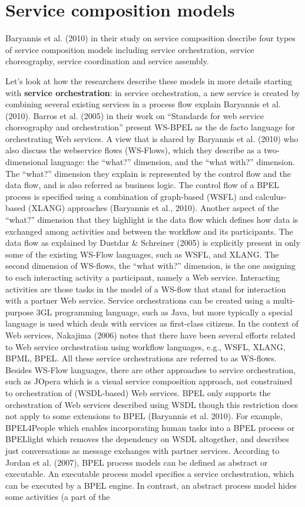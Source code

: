 \documentclass{article}
\begin{document}
\section{Service composition models}

Baryannis et al. (2010) in their study on service composition describe four types of service composition models including service orchestration, service choreography, service coordination and service assembly. 

Let’s look at how the researchers describe these models in more details starting with \textbf{service orchestration}: in service orchestration, a new service is created by combining several existing services in a process flow explain Baryannis et al. (2010). Barros et al. (2005) in their work on “Standards for web service choreography and orchestration” present WS-BPEL as the de facto language for orchestrating Web services. A view that is shared by Baryannis et al. (2010) who also discuss the webservice flows (WS-Flows), which they describe as a two-dimensional language: the “what?” dimension, and the “what with?” dimension. The “what?” dimension they explain is represented by the control flow and the data flow, and is also referred as business logic. The control flow of a BPEL process is specified using a combination of graph-based (WSFL) and calculus-based (XLANG) approaches (Baryannis et al., 2010). Another aspect of the “what?” dimension that they highlight is the data flow which defines how data is exchanged among activities and between the workflow and its participants. The data flow as explained by Dustdar \& Schreiner (2005) is explicitly present in only some of the existing WS-Flow languages, such as WSFL, and XLANG. The second dimension of WS-flows, the “what with?” dimension, is the one assigning to each interacting activity a participant, namely a Web service. Interacting activities are those tasks in the model of a WS-flow that stand for interaction with a partner Web service. Service orchestrations can be created using a multi-purpose 3GL programming language, such as Java, but more typically a special language is used which deals with services as first-class citizens. In the context of Web services, Nakajima (2006) notes that there have been several efforts related to Web service orchestration using workflow languages, e.g., WSFL, XLANG, BPML, BPEL. All these service orchestrations are referred to as WS-flows. Besides WS-Flow languages, there are other approaches to service orchestration, such as JOpera which is a visual service composition approach, not constrained to orchestration of (WSDL-based) Web services. BPEL only supports the orchestration of Web services described using WSDL though this restriction does not apply to some extensions to BPEL (Baryannis et al. 2010). For example, BPEL4People which enables incorporating human tasks into a BPEL process or BPELlight which removes the dependency on WSDL altogether, and describes just conversations as message exchanges with partner services. According to Jordan et al. (2007), BPEL process models can be defined as abstract or executable. An executable process model specifies a service orchestration, which can be executed by a BPEL engine. In contrast, an abstract process model hides some activities (a part of the 
\end{document}
